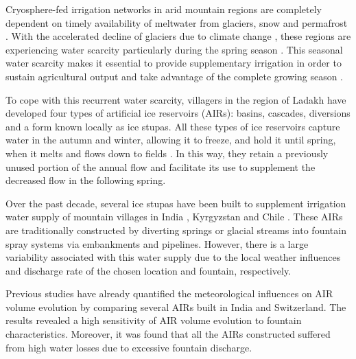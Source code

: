 \documentclass[tc, manuscript]{copernicus}
\begin{document}
\introduction

Cryosphere-fed irrigation networks in arid mountain regions are completely dependent on timely availability of
meltwater from glaciers, snow and permafrost \citep{farhanHydrologicalRegimesConjunction2015}. With the
accelerated decline of glaciers due to climate change \citep{nusserLocalKnowledgeGlobal2016}, these regions are
experiencing water scarcity particularly during the spring season \citep{norphelSnowWaterHarvesting2015}. This
seasonal water scarcity makes it essential to provide supplementary irrigation in order to sustain agricultural
output and take advantage of the complete growing season \citep{nusserLocalKnowledgeGlobal2016,
vincentEnergyClimateChange2009}.

To cope with this recurrent water scarcity, villagers in the region of Ladakh have developed four types of
artificial ice reservoirs (AIRs): basins, cascades, diversions and a form known locally as ice stupas. All these
types of ice reservoirs capture water in the autumn and winter, allowing it to freeze, and hold it until spring,
when it melts and flows down to fields \citep{vinceGlacierMan2009, clouseLadakhArtificialGlaciers2017,
nusserSociohydrologyArtificialGlaciers2019, ipccChapterHighMountain2019}. In this way, they retain a previously
unused portion of the annual flow and facilitate its use to supplement the decreased flow in the following
spring. 

Over the past decade, several ice stupas have been built to supplement irrigation water supply of mountain
villages in India \citep{wangchukIceStupaCompetition2020, palmerStoringFrozenWater2022,
aggarwalAdaptationClimateChange2021}, Kyrgyzstan \citep{bbcnewsBrightArtificialGlacier2020} and Chile
\citep{reutersConservationistsChileAim2021}. These AIRs are traditionally constructed by diverting springs or
glacial streams into fountain spray systems via embankments and pipelines. However, there is a large variability
associated with this water supply due to the local weather influences and discharge rate of the chosen location
and fountain, respectively. 

Previous studies \citep{balasubramanianInfluenceMeteorologicalConditions2022,
oerlemansBriefCommunicationGrowth2021} have already quantified the meteorological influences on AIR volume
evolution by comparing several AIRs built in India and Switzerland. The results revealed a high sensitivity of
AIR volume evolution to fountain characteristics. Moreover, it was found that all the AIRs constructed
suffered from high water losses due to excessive fountain discharge. 
\end{document}
